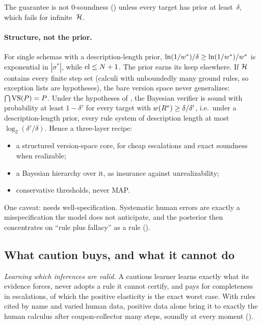 The guarantee is not $0$-soundness () unless every target has prior at least~$\delta$, which fails for infinite~$\mathcal{H}$.

\paragraph{Structure, not the prior.} For single schemas with a description-length prior, $\ln(1/w^{*})/\delta\ge\ln(1/w^{*})/w^{*}$ is exponential in $|\sigma^*|$, while $\mathrm{el}\le N+1$. The prior earns its keep elsewhere. If $\mathcal{H}$ contains every finite step set (calculi with unboundedly many ground rules, so exception lists are hypotheses), the bare version space never generalizes: $\bigcap\mathrm{VS}(P)=P$. Under the hypotheses of , the Bayesian verifier is sound with probability at least $1-\delta'$ for every target with $w(R^{*})\ge\delta/\delta'$, i.e.\ under a description-length prior, every rule system of description length at most $\log_2(\delta'/\delta)$. Hence a three-layer recipe:
\begin{itemize}
\item a structured version-space core, for cheap escalations and exact soundness when realizable;
\item a Bayesian hierarchy over it, as insurance against unrealizability;
\item conservative thresholds, never MAP.
\end{itemize}
One caveat:  needs well-specification. Systematic human errors are exactly a misspecification the model does not anticipate, and the posterior then concentrates on ``rule plus fallacy'' as a rule ().

\subsection{What caution buys, and what it cannot do}\label{sec:caution:reading}

\emph{Learning which inferences are valid.} A cautious learner learns exactly what its evidence forces, never adopts a rule it cannot certify, and pays for completeness in escalations, of which the positive elasticity is the exact worst case. With rules cited by name and varied human data, positive data alone bring it to exactly the human calculus after coupon-collector many steps, soundly at every moment ().

